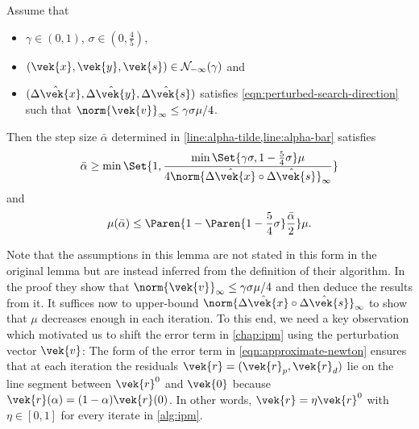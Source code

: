 \begin{lemma}\label{thm:alpha-bar-bound}
  Assume that 
  \begin{itemize}
    \item \(\gamma \in (0, 1)\), \(\sigma \in (0, \frac{4}{5})\),
    \item \((\vek{x}, \vek{y}, \vek{s}) \in \mathcal{N}_{-\infty}(\gamma)\) and
    \item \((\hat{\Delta\vek{x}}, \hat{\Delta\vek{y}}, \hat{\Delta\vek{s}})\) satisfies \cref{eqn:perturbed-search-direction} such that \(\norm{\vek{v}}_\infty \leq \gamma \sigma \mu / 4\).
  \end{itemize}
  Then the step size \(\bar{\alpha}\) determined in \cref{line:alpha-tilde,line:alpha-bar} satisfies
  \[ \bar{\alpha} \geq \min \Set{1, \frac{\min \Set{\gamma \sigma, 1 - \frac{5}{4}\sigma} \mu}{4 \norm{\hat{\Delta\vek{x}} \circ \hat{\Delta\vek{s}}}_\infty}} \]
  and
  \[ \mu(\bar{\alpha}) \leq \Paren{1 - \Paren{1 - \frac{5}{4}\sigma} \frac{\bar{\alpha}}{2}} \mu. \]
\end{lemma}

Note that the assumptions in this lemma are not stated in this form in the original lemma but are instead inferred from the definition of their algorithm.
In the proof they show that \(\norm{\vek{v}}_\infty \leq \gamma \sigma \mu / 4\) and then deduce the results from it.
It suffices now to upper-bound \(\norm{\hat{\Delta\vek{x}} \circ \hat{\Delta\vek{s}}}_\infty\) to show that \(\mu\) decreases enough in each iteration.
To this end, we need a key observation which motivated us to shift the error term in \cref{chap:ipm} using the perturbation vector \(\vek{v}\):
The form of the error term in \cref{eqn:approximate-newton} ensures that at each iteration the residuals \(\vek{r} = (\vek{r}_p, \vek{r}_d)\) lie on the line segment between \(\vek{r}^0\) and \(\vek{0}\)
because \(\vek{r}(\alpha) = (1 - \alpha) \vek{r}(0)\).
In other words, \(\vek{r} = \eta \vek{r}^0\) with \(\eta \in [0, 1]\) for every iterate in \cref{alg:ipm}.

